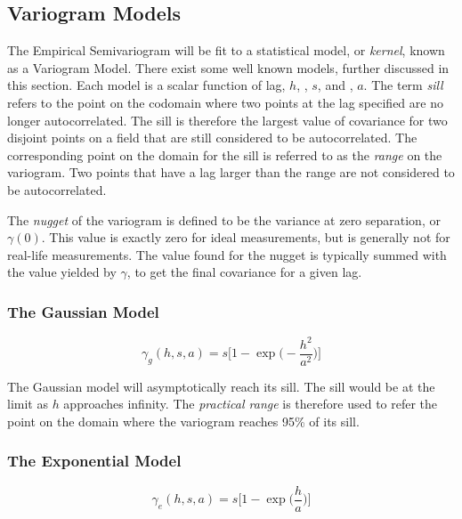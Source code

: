 \subsection{Variogram Models} \label{sec:variomodels}
The Empirical Semivariogram will be fit to a statistical model, or \textit{kernel}, known as a Variogram Model. There exist some well known models, further discussed in this section. Each model is a scalar function of lag, $h$, , $s$, and , $a$. The term \textit{sill} refers to the point on the codomain where two points at the lag specified are no longer autocorrelated. The sill is therefore the largest value of covariance for two disjoint points on a field that are still considered to be autocorrelated. The corresponding point on the domain for the sill is referred to as the \textit{range} on the variogram. Two points that have a lag larger than the range are not considered to be autocorrelated.

The \textit{nugget} of the variogram is defined to be the variance at zero separation, or $\gamma(0)$. This value is exactly zero for ideal measurements, but is generally not for real-life measurements. The value found for the nugget is typically summed with the value yielded by $\gamma$, to get the final covariance for a given lag.

\subsubsection{The Gaussian Model}

\begin{equation}
	\gamma_g(h, s, a) = s \Bigg[ 1 - \exp \Bigg( -\dfrac{h^2}{a^2} \Bigg) \Bigg]
	\label{eq:gauss_model}
\end{equation}

The Gaussian model will asymptotically reach its sill. The sill would be at the limit as $h$ approaches infinity. The \textit{practical range} is therefore used to refer the point on the domain where the variogram reaches 95\% of its sill.

\subsubsection{The Exponential Model}

\begin{equation}
	\gamma_e(h, s, a) = s \Bigg[ 1 - \exp \Bigg( \dfrac{h}{a} \Bigg) \Bigg]
	\label{eq:exp_model}
\end{equation}

